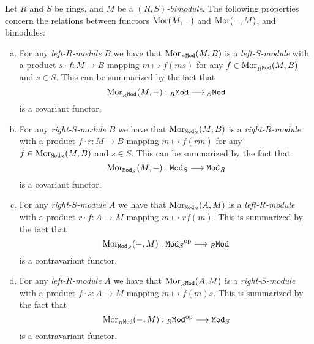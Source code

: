 \begin{proposition}
\label{prop:hom-functor-and-bimodules}
Let \(R\) and \(S\) be rings, and \(M\) be a \emph{\((R, S)\)-bimodule}. The
following properties concern the relations between functors \(\operatorname{Mor}(M, -)\) and
\(\operatorname{Mor}(-, M)\), and bimodules:
\begin{enumerate}[(a)]\setlength\itemsep{0em}
\item For any \emph{left-\(R\)-module} \(B\) we have that
  \(\operatorname{Mor}_{{{}_{R}\texttt{Mod}}}(M, B)\) is a \emph{left-\(S\)-module} with a product
  \(s \cdot f: M \to B\) mapping \(m \mapsto f(m s)\) for any
  \(f \in \operatorname{Mor}_{{{}_{R}\texttt{Mod}}}(M, B)\) and \(s \in S\). This can be summarized by the
  fact that
  \[
  \operatorname{Mor}_{{{}_{R}\texttt{Mod}}}(M, -): {{}_{R}\texttt{Mod}} \longrightarrow {{}_{S}\texttt{Mod}}
  \]
  is a covariant functor.

\item For any \emph{right-\(S\)-module} \(B\) we have that
  \(\operatorname{Mor}_{{\texttt{Mod}_{S}}}(M, B)\) is a \emph{right-\(R\)-module} with a product
  \(f \cdot r: M \to B\) mapping \(m \mapsto f(r m)\) for any
  \(f \in \operatorname{Mor}_{{\texttt{Mod}_{S}}}(M, B)\) and \(s \in S\). This can be summarized by the
  fact that
  \[
  \operatorname{Mor}_{{\texttt{Mod}_{S}}}(M, -): {\texttt{Mod}_{S}} \longrightarrow {\texttt{Mod}_{R}}
  \]
  is a covariant functor.

\item For any \emph{right-\(S\)-module} \(A\) we have that \(\operatorname{Mor}_{{\texttt{Mod}_{S}}}(A,
  M)\) is a \emph{left-\(R\)-module} with a product \(r \cdot f: A \to M\)
  mapping \(m \mapsto r f(m)\). This is summarized by the fact that
  \[
  \operatorname{Mor}_{{\texttt{Mod}_{S}}}(-, M): {\texttt{Mod}_{S}}^{\mathrm{op}} \longrightarrow {{}_{R}\texttt{Mod}}
  \]
  is a contravariant functor.

\item For any \emph{left-\(R\)-module} \(A\) we have that \(\operatorname{Mor}_{{{}_{R}\texttt{Mod}}}(A,
  M)\) is a \emph{right-\(S\)-module} with a product \(f \cdot s: A \to M\)
  mapping \(m \mapsto f(m) s\). This is summarized by the fact that
  \[
  \operatorname{Mor}_{{{}_{R}\texttt{Mod}}}(-, M): {{}_{R}\texttt{Mod}}^{\mathrm{op}} \longrightarrow {\texttt{Mod}_{S}}
  \]
  is a contravariant functor.
\end{enumerate}
\end{proposition}

